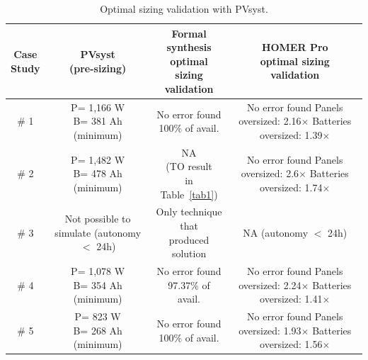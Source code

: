 \documentclass[journal]{IEEEtran}
\begin{document}
\begin{table}
\caption{Optimal sizing validation with PVsyst.}
\label{tab2}
\begin{scriptsize}
\begin{tabular}{c|c|c|c}
\hline
\hline
\makecell{Case\\Study} & \makecell{PVsyst\\(pre-sizing)}&\makecell{Formal synthesis\\optimal sizing\\validation}& \makecell{HOMER Pro\\optimal sizing\\validation}\\
\hline
\hline
\# 1 & \makecell{P= 1,166 W\\B= 381 Ah\\(minimum)}&\makecell{No error found \\100\% of avail.} & \makecell{No error found\\Panels oversized: 2.16$\times$\\Batteries oversized: 1.39$\times$}\\
\hline
\# 2 & \makecell{P= 1,482 W\\B= 478 Ah\\(minimum)}&\makecell{NA \\(TO result\\in Table~\ref{tab1})} & \makecell{No error found\\Panels oversized: 2.6$\times$\\Batteries oversized: 1.74$\times$}\\
\hline
\# 3 & \makecell{Not possible to \\simulate\\(autonomy $<$ 24h)} &\makecell{Only technique that\\produced solution} & \makecell{NA\\(autonomy $<$ 24h)}\\
\hline
\# 4 & \makecell{P= 1,078 W\\B= 354 Ah\\(minimum)}&\makecell{No error found \\97.37\% of avail.} & \makecell{No error found\\Panels oversized: 2.24$\times$\\Batteries oversized: 1.41$\times$}\\
\hline
\# 5 & \makecell{P= 823 W\\B= 268 Ah\\(minimum)}&\makecell{No error found \\100\% of avail.} & \makecell{No error found\\Panels oversized: 1.93$\times$\\Batteries oversized:  1.56$\times$}\\

\end{tabular}
\end{scriptsize}
\end{table}
\end{document}
